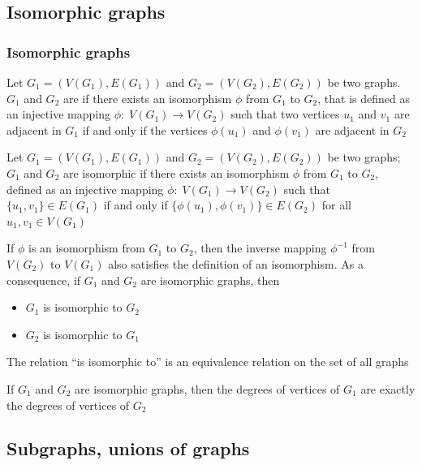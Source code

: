 \documentclass[aspectratio=43]{beamer}
\begin{document}
\subsection{Isomorphic graphs}

\begin{frame} \frametitle{Isomorphic graphs} 
\begin{definition}
Let $G_1=(V(G_1),E(G_1))$ and $G_2=(V(G_2),E(G_2))$ be two graphs.
$G_1$ and $G_2$ are  if there exists an isomorphism $\phi$ from $G_1$ to $G_2$, that is defined as an injective mapping $\phi:\; V(G_1) \rightarrow V(G_2)$ such that two vertices $u_1$ and $v_1$ are adjacent in $G_1$ if and only if the vertices $\phi(u_1)$ and $\phi(v_1)$ are adjacent in $G_2$
\end{definition}
\vfill
\begin{definition}
Let $G_1=(V(G_1),E(G_1))$ and $G_2=(V(G_2),E(G_2))$ be two graphs;
$G_1$ and $G_2$ are isomorphic if there exists an isomorphism $\phi$ from $G_1$ to $G_2$, defined as 
an injective mapping $\phi : \; V(G_1) \rightarrow V(G_2)$ such that $\{u_1,v_1\} \in E(G_1)$ if and only if $\{\phi(u_1),\phi(v_1)\}\in E(G_2)$ for all $u_1, v_1 \in V(G_1)$
\end{definition}
\end{frame}
 
 
 
\begin{frame}
If $\phi$ is an isomorphism from $G_1$ to $G_2$, then the inverse mapping $\phi ^{-1}$ from $V(G_2)$ to $V(G_1)$ also satisfies the definition of an isomorphism.
As a consequence, if $G_1$ and $G_2$ are isomorphic graphs, then
\begin{itemize}
\item $G_1$ is isomorphic to $G_2$
\item $G_2$ is isomorphic to $G_1$
\end{itemize}
\vfill
\begin{theorem}
The relation ``is isomorphic to'' is an equivalence relation on the set of all graphs
\end{theorem}
\vfill
\begin{theorem}
If $G_1$ and $G_2$ are isomorphic graphs, then the degrees of vertices of $G_1$ are exactly the degrees of vertices of $G_2$
\end{theorem}
\end{frame}


\subsection{Subgraphs, unions of graphs}
\end{document}
